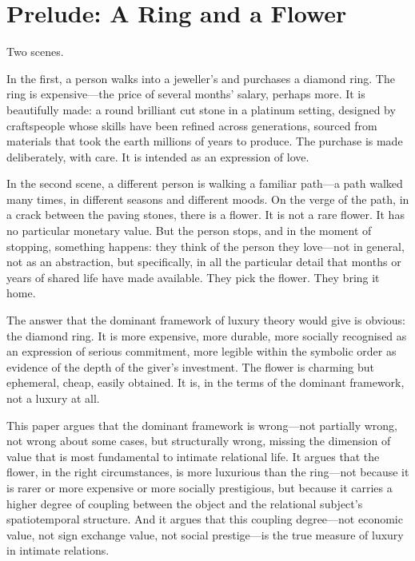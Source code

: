 \section{Prelude: A Ring and a Flower}
\label{p16:sec:prelude}

\noindent
Two scenes.

In the first, a person walks into a jeweller's and purchases a diamond ring. The ring is expensive---the price of several months' salary, perhaps more. It is beautifully made: a round brilliant cut stone in a platinum setting, designed by craftspeople whose skills have been refined across generations, sourced from materials that took the earth millions of years to produce. The purchase is made deliberately, with care. It is intended as an expression of love.

In the second scene, a different person is walking a familiar path---a path walked many times, in different seasons and different moods. On the verge of the path, in a crack between the paving stones, there is a flower. It is not a rare flower. It has no particular monetary value. But the person stops, and in the moment of stopping, something happens: they think of the person they love---not in general, not as an abstraction, but specifically, in all the particular detail that months or years of shared life have made available. They pick the flower. They bring it home.


The answer that the dominant framework of luxury theory would give is obvious: the diamond ring. It is more expensive, more durable, more socially recognised as an expression of serious commitment, more legible within the symbolic order as evidence of the depth of the giver's investment. The flower is charming but ephemeral, cheap, easily obtained. It is, in the terms of the dominant framework, not a luxury at all.

This paper argues that the dominant framework is wrong---not partially wrong, not wrong about some cases, but structurally wrong, missing the dimension of value that is most fundamental to intimate relational life. It argues that the flower, in the right circumstances, is more luxurious than the ring---not because it is rarer or more expensive or more socially prestigious, but because it carries a higher degree of coupling between the object and the relational subject's spatiotemporal structure. And it argues that this coupling degree---not economic value, not sign exchange value, not social prestige---is the true measure of luxury in intimate relations.

